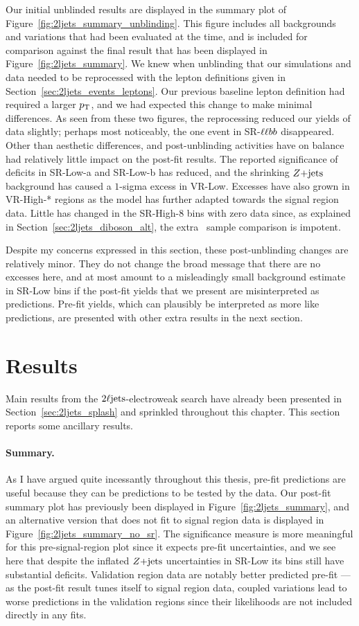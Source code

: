 Our initial unblinded results are displayed in the summary plot of
Figure~\ref{fig:2ljets_summary_unblinding}.
This figure includes all backgrounds and variations that had been evaluated
at the time, and is included for comparison against the final result
that has been displayed in Figure~\ref{fig:2ljets_summary}.
We knew when unblinding that our simulations and data needed to be reprocessed
with the lepton definitions given in Section~\ref{sec:2ljets_events_leptons}.
Our previous baseline lepton definition had required a larger $p_\mathrm{T}$,
and we had expected this change to make minimal differences.
As seen from these two figures, the reprocessing reduced our yields of data
slightly; perhaps most noticeably, the one event in SR-$\ell\ell bb$ disappeared.
Other than aesthetic differences, and post-unblinding activities have on
balance had relatively little impact on the post-fit results.
The reported significance of deficits in SR-Low-a and SR-Low-b has reduced,
and the shrinking $Z\mathrm{+jets}$ background has caused a $1$-sigma excess in VR-Low.
Excesses have also grown in VR-High-* regions as the model has further
adapted towards the signal region data.
Little has changed in the SR-High-8 bins with zero data since, as explained in
Section~\ref{sec:2ljets_diboson_alt}, the extra \diboson\ sample comparison
is impotent.

Despite my concerns expressed in this section, these post-unblinding changes
are relatively minor.
They do not change the broad message that there are no excesses here, and at
most amount to a misleadingly small background estimate in SR-Low bins if the
post-fit yields that we present are misinterpreted as predictions.
Pre-fit yields, which can plausibly be interpreted as more like predictions,
are presented with other extra results in the next section.


\section{Results}
\label{sec:2ljets_results}
Main results from the $2\ell\mathrm{jets}$-electroweak search have already been
presented in Section~\ref{sec:2ljets_splash} and sprinkled throughout this
chapter.
This section reports some ancillary results.

\paragraph{Summary.}
As I have argued quite incessantly throughout this thesis, pre-fit predictions
are useful because they can be predictions to be tested by the data.
Our post-fit summary plot has previously been displayed in
Figure~\ref{fig:2ljets_summary}, and an alternative version that does not fit
to signal region data is displayed in Figure~\ref{fig:2ljets_summary_no_sr}.
The significance measure is more meaningful for this pre-signal-region plot
since it expects pre-fit uncertainties, and we see here that despite the
inflated $Z\mathrm{+jets}$ uncertainties in SR-Low its bins still have substantial
deficits.
Validation region data are notably better predicted pre-fit ---
as the post-fit result tunes itself to signal region data, coupled variations
lead to worse predictions in the validation regions since their likelihoods are
not included directly in any fits.

